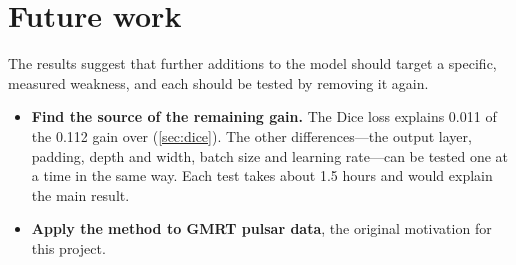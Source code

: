 \section{Future work}
The results suggest that further additions to the model should target a
specific, measured weakness, and each should be tested by removing it again.
\begin{itemize}
  \item \textbf{Find the source of the remaining gain.} The Dice loss
    explains 0.011 of the 0.112 gain over \tfunet{} (\cref{sec:dice}). The
    other differences---the output layer, padding, depth and width, batch size
    and learning rate---can be tested one at a time in the same way. Each test
    takes about 1.5 hours and would explain the main result.
  \item \textbf{Apply the method to GMRT pulsar data}, the original motivation
    for this project.
\end{itemize}
